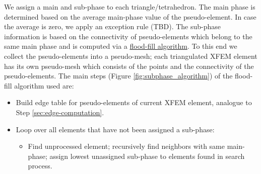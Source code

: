 We assign a main and sub-phase to each triangle/tetrahedron. The main phase is determined based on the average main-phase value of the pseudo-element.  In case the average is zero, we apply an exception rule (TBD). The sub-phase information is based on the connectivity of pseudo-elements which belong to the same main phase and is computed via a \href{http://en.wikipedia.org/wiki/Flood_fill}{flood-fill algorithm}. To this end we collect the pseudo-elements into a pseudo-mesh; each triangulated XFEM element has its own pseudo-mesh which consists of the points and the connectivity of the pseudo-elements.
The main steps (Figure \ref{fig:subphase_algorithm}) of the flood-fill algorithm used are:

\begin{itemize}
\item Build edge table for pseudo-elements of current XFEM element, analogue to Step \ref{sec:edge-computation}.
\item Loop over all elements that have not been assigned a sub-phase:
	\begin{itemize}
	\item Find unprocessed element; recursively find neighbors with same main-phase; assign lowest unassigned sub-phase to elements found in search process.
	\end{itemize}
\end{itemize}


